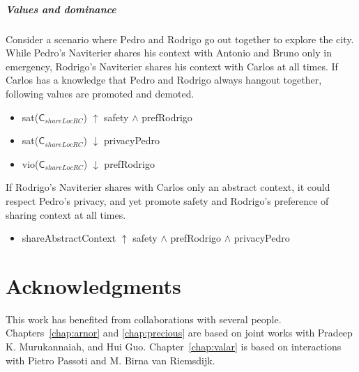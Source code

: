 \documentclass[11pt,          %
               phd,           %
               onehalfspacing %
               ]{ncsuthesis}
\newcommand{\msf}{\mathsf}
\newcommand{\C}{\msf{C}}
\newcommand{\navigationapp}{Naviterier\xspace}
\newcommand{\nsa}[1]{\textcolor{green!50!black}{NSA:~~#1}}
\begin{document}
\paragraph*{Values and dominance}

Consider a scenario where Pedro and Rodrigo go out together to explore
the city. While Pedro's \navigationapp shares his context with Antonio
and Bruno only in emergency, Rodrigo's \navigationapp shares his context
with Carlos at all times. If Carlos has a knowledge that Pedro and Rodrigo
always hangout together, following values are promoted and demoted.

\begin{itemize}
\item sat($\C_{shareLocRC}$) $\uparrow$ safety $\land$ prefRodrigo

\item sat($\C_{shareLocRC}$) $\downarrow$ privacyPedro

\item vio($\C_{shareLocRC}$) $\downarrow$ prefRodrigo
\end{itemize}

If Rodrigo's \navigationapp shares with Carlos only an abstract
context, it could respect Pedro's privacy, and yet promote safety and
Rodrigo's preference of sharing context at all times.

\begin{itemize}
\item shareAbstractContext $\uparrow$ safety $\land$ prefRodrigo $\land$ privacyPedro
\end{itemize}

%


\chapter{Acknowledgments}
\label{chap:ack}

This work has benefited from collaborations with several people.
Chapters~\ref{chap:arnor} and \ref{chap:precious} are based on joint
works with Pradeep K. Murukannaiah, and Hui Guo.
Chapter~\ref{chap:valar} is based on interactions with Pietro Passoti
and M. Birna van Riemsdijk.
\end{document}
